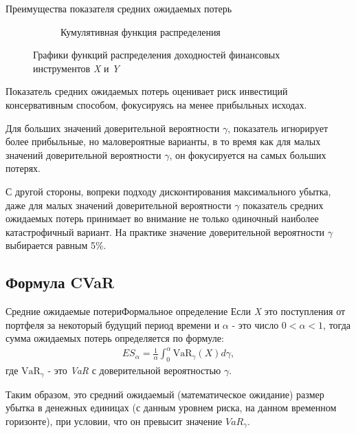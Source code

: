 \documentclass[financial_risks_lectures.tex]{subfiles}
\begin{document}
\begin{frame}[allowframebreaks]{Преимущества показателя средних ожидаемых потерь}
\begin{figure}
\begin{subfigure}[t]{4.1cm}
		\caption{Кумулятивная функция распределения}\label{fig:b_cdf}
	\end{subfigure}
	\caption{Графики функций распределения доходностей финансовых инструментов \textit{X }и \textit{Y}}\label{fig:df_and_cdf}
\end{figure}
Показатель средних ожидаемых потерь оценивает риск инвестиций консервативным способом, фокусируясь на менее прибыльных исходах. 

\pagebreak

Для больших значений доверительной вероятности $\gamma$, показатель игнорирует более прибыльные, но маловероятные варианты, в то время как для малых значений доверительной вероятности $\gamma$, он фокусируется на самых больших потерях. 

С другой стороны, вопреки подходу дисконтирования максимального убытка, даже для малых значений доверительной вероятности $\gamma$ показатель средних ожидаемых потерь принимает во внимание не только одиночный наиболее катастрофичный вариант. 
На практике значение доверительной вероятности $\gamma$ выбирается равным 5\%.

\end{frame}
\subsection{Формула CVaR}
\begin{frame}{Средние ожидаемые потери}{Формальное определение}
Если \textit{X }это поступления от портфеля за некоторый будущий период времени и $\alpha$ - это число $0<\alpha<1$, тогда сумма ожидаемых потерь определяется по формуле:
\begin{align}
\label{es}
ES_{\alpha} = \frac{1}{\alpha}\int_0^{\alpha} \mbox{VaR}_{\gamma}(X)d\gamma,
\end{align}
где  $\mbox{VaR}_{\gamma}$ - это \textit{VaR} с доверительной вероятностью $\gamma$.

Таким образом, это средний ожидаемый (математическое ожидание) размер убытка в денежных единицах (с данным уровнем риска, на данном временном горизонте), при условии, что он превысит значение $VaR_{\gamma}$.
\end{frame}
\end{document}
